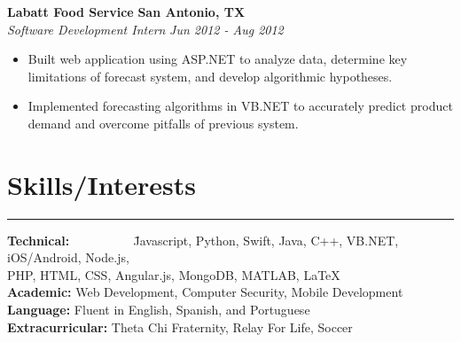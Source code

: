 \documentclass{res}
\begin{document}
\begin{resume}
 {\bf Labatt Food Service} \hfill {\bf San Antonio, TX} \\
{\textit {Software Development Intern}} \hfill {\textit {Jun 2012 - Aug 2012}} 
\begin{itemize}
\renewcommand{\labelitemi}{\ding{117}}
\itemsep -2pt  
 \item Built web application using ASP.NET to analyze data, determine key limitations of
	forecast system, and develop algorithmic hypotheses.
 \item Implemented forecasting algorithms in VB.NET to accurately predict product demand
	and overcome pitfalls of previous system.
 \end{itemize}

\vspace{-9pt}

\section{{\large Skills/Interests}}

\vspace{-10pt}

\noindent\rule{\resumewidth}{0.4pt}  
\vspace{-30pt}
\begin{tabbing}
 {\bf Technical: } ~~~~~~~~~ \= Javascript, Python, Swift, Java, C++, VB.NET, iOS/Android, Node.js,\\
\> PHP, HTML, CSS, Angular.js, MongoDB, MATLAB, \LaTeX \\
{\bf Academic: } \>  Web Development, Computer Security, Mobile Development \\
{\bf Language: } \> Fluent in English, Spanish, and Portuguese\\
{\bf Extracurricular: } \> Theta Chi Fraternity, Relay For Life, Soccer \\
\end{tabbing}

\end{resume} 
\end{document}
